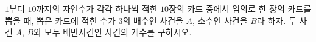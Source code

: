$1$부터 $10$까지의 자연수가 각각 하나씩 적힌 $10$장의 카드 중에서 임의로 한 장의 카드를 뽑을 때, 뽑은 카드에 적힌 수가 $3$의 배수인 사건을 $A$, 소수인 사건을 $B$라 하자. 두 사건 $A$, $B$와 모두 배반사건인 사건의 개수를 구하시오.
